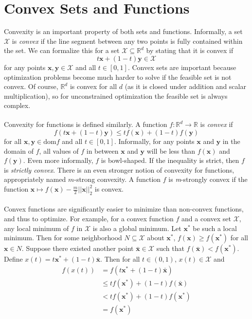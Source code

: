 \documentclass{article}
\begin{document}
\section{Convex Sets and Functions}
Convexity is an important property of both sets and functions. Informally, a set $\mathcal{X}$ is \textit{convex} if the line segment between any two points is fully contained within the set. We can formalize this for a set $\mathcal{X} \subseteq \mathbb{R}^d$ by stating that it is convex if $$t\mathbf{x} + (1-t)\mathbf{y} \in \mathcal{X}$$ for any points $\mathbf{x, y} \in \mathcal{X}$ and all $t \in [0, 1]$. Convex sets are important because optimization problems become much harder to solve if the feasible set is not convex. Of course, $\mathbb{R}^d$ is convex for all $d$ (as it is closed under addition and scalar multiplication), so for unconstrained optimization the feasible set is always complex.\\\\
Convexity for functions is defined similarly. A function $f: \mathbb{R}^d \rightarrow \mathbb{R}$ is \textit{convex} if $$f(t\mathbf{x} + (1-t)\mathbf{y}) \leq tf(\mathbf{x}) + (1-t)f(\mathbf{y})$$ for all $\mathbf{x, y} \in \text{dom} f$ and all $t \in [0, 1]$. Informally, for any points $\mathbf{x}$ and $\mathbf{y}$ in the domain of $f$, all values of $f$ in between $\mathbf{x}$ and $\mathbf{y}$ will be less than $f(\mathbf{x})$ and $f(\mathbf{y})$. Even more informally, $f$ is bowl-shaped. If the inequality is strict, then $f$ is \textit{strictly convex}. There is an even stronger notion of convexity for functions, appropriately named $m$-strong convexity. A function $f$ is \textit{m}-strongly convex if the function $\mathbf{x} \mapsto f(\mathbf{x}) - \frac{m}{2}||\mathbf{x}||_2^2$ is convex.\\\\
Convex functions are significantly easier to minimize than non-convex functions, and thus to optimize. For example, for a convex function $f$ and a convex set $\mathcal{X}$, any local minimum of $f$ in $\mathcal{X}$ is also a global minimum. Let $\mathbf{x}^*$ be such a local minimum. Then for some neighborhood $N \subseteq \mathcal{X}$ about $\mathbf{x}^*$, $f(\mathbf{x}) \geq f(\mathbf{x}^*)$ for all $\mathbf{x} \in N$. Suppose there existed another point $\bar{\mathbf{x}} \in \mathcal{X}$ such that $f(\bar{\mathbf{x}}) < f(\mathbf{x}^*)$. Define $x(t) = t\mathbf{x}^* + (1-t)\bar{\mathbf{x}}$. Then for all $t \in (0, 1)$, $x(t) \in \mathcal{X}$ and
\begin{align*}
f(x(t)) &= f(t\mathbf{x}^* + (1-t)\bar{\mathbf{x}})\\
          &\leq tf(\mathbf{x}^*) + (1-t)f(\bar{\mathbf{x}})\\
          &<  tf(\mathbf{x}^*) + (1-t)f(\mathbf{x}^*)\\
          &= f(\mathbf{x}^*)
\end{align*}
\end{document}
